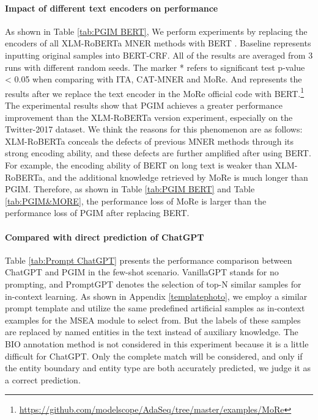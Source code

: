 \documentclass[11pt]{article}
\begin{document}
\paragraph{Impact of different text encoders on performance}
As shown in Table \ref{tab:PGIM BERT}, We perform experiments by replacing the encoders of all XLM-RoBERTa \citep{conneau2019unsupervised} MNER methods with BERT \citep{kenton2019bert}. Baseline represents inputting original samples into BERT-CRF. All of the results are averaged from 3 runs with different random seeds. The marker * refers to significant test p-value < 0.05 when comparing with ITA, CAT-MNER and MoRe. And  represents the results after we replace the text encoder in the MoRe official code with BERT.\footnote{\url{https://github.com/modelscope/AdaSeq/tree/master/examples/MoRe}} The experimental results show that PGIM achieves a greater performance improvement than the XLM-RoBERTa version experiment, especially on the Twitter-2017 dataset. We think the reasons for this phenomenon are as follows: XLM-RoBERTa conceals the defects of previous MNER methods through its strong encoding ability, and these defects are further amplified after using BERT. For example, the encoding ability of BERT on long text is weaker than XLM-RoBERTa, and the additional knowledge retrieved by MoRe is much longer than PGIM. Therefore, as shown in Table \ref{tab:PGIM BERT} and Table \ref{tab:PGIM&MORE}, the performance loss of MoRe is larger than the performance loss of PGIM after replacing BERT. 

  
\paragraph{Compared with direct prediction of ChatGPT}
\label{ChatGPT direct prediction}
Table \ref{tab:Prompt ChatGPT} presents the performance comparison between ChatGPT and PGIM in the few-shot scenario. VanillaGPT stands for no prompting, and PromptGPT denotes the selection of top-N similar samples for in-context learning.
As shown in Appendix \ref{templatephoto}, we employ a similar prompt template and utilize the same predefined artificial samples as in-context examples for the MSEA module to select from. But the labels of these samples are replaced by named entities in the text instead of auxiliary knowledge. 
The BIO annotation method is not considered in this experiment because it is a little difficult for ChatGPT.
Only the complete match will be considered, and only if the entity boundary and entity type are both accurately predicted, we judge it as a correct prediction. 
\end{document}
